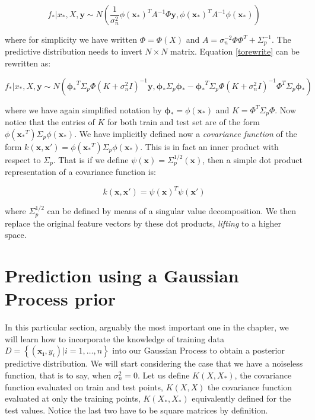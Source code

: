 \documentclass[10pt,a4paper,twoside]{book}
\begin{document}
\begin{equation}
\label{torewrite}
f_{*}|x_{*}, X, \boldsymbol{y} \sim N\left( \dfrac{1}{\sigma^2_n}\phi(\boldsymbol{x_*})^T A^{-1}\Phi \boldsymbol{y}, \phi(\boldsymbol{x_*})^T A^{-1}\phi(\boldsymbol{x_*})    \right)
\end{equation}

where for simplicity we have written $\Phi = \Phi(X)$ and $A = \sigma_n^{-2}\Phi\Phi^T + \Sigma_p^{-1}$. The predictive distribution needs to invert $N \times N$ matrix. Equation \ref{torewrite} can be rewritten as:

\begin{equation}
f_{*}|x_{*}, X, \boldsymbol{y} \sim N\left(\boldsymbol{\phi_*}^T\Sigma_p\Phi(K + \sigma^2_n I)^{-1}\boldsymbol{y}, \boldsymbol{\phi_*}\Sigma_p\boldsymbol{\phi_*} - \boldsymbol{\phi_*}^T\Sigma_p\Phi(K + \sigma^2_n I)^{-1}\Phi^T\Sigma_p\boldsymbol{\phi_*}\right)
\end{equation}

where we have again simplified notation by $\boldsymbol{\phi_*} = \phi(\boldsymbol{x_*})$ and $K = \Phi^T\Sigma_p\Phi$. Now notice that the entries of $K$ for both train and test set are of the form  $\phi(\boldsymbol{x_*}^T)\Sigma_p\phi(\boldsymbol{x_*})$. We have implicitly defined now a \textit{covariance function} of the form $k(\boldsymbol{x}, \boldsymbol{x'}) = \phi(\boldsymbol{x_*}^T)\Sigma_p\phi(\boldsymbol{x_*})$. This is in fact an inner product with respect to $\Sigma_p$. That is if we define $\psi(\boldsymbol{x}) = \Sigma_p^{1/2}(\boldsymbol{x})$, then a simple dot product representation of a covariance function is:

\begin{equation}
k(\boldsymbol{x}, \boldsymbol{x'}) = \psi(\boldsymbol{x})^T\psi(\boldsymbol{x'})
\end{equation}

where $\Sigma_p^{1/2}$ can be defined by means of a singular value decomposition. We then replace the original feature vectors by these dot products, \textit{lifting} to a higher space.

\section{Prediction using a Gaussian Process prior}
\label{pred}

In this particular section, arguably the most important one in the chapter, we will learn how to incorporate the knowledge of training data $D = \left\lbrace \left(\boldsymbol{x_i}, y_i\right) | i = 1,\dots,n\right\rbrace$ into our Gaussian Process to obtain a posterior predictive distribution. We will start considering the case that we have a noiseless function, that is to say, when $\sigma^2_n = 0$. Let us define $K(X, X_{*})$, the covariance function evaluated on train and test points, $K(X, X)$ the covariance function evaluated at only the training points, $K(X_{*}, X_{*})$ equivalently defined for the test values. Notice the last two have to be square matrices by definition.\\
\end{document}
